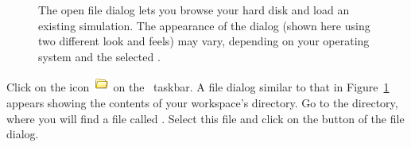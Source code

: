\begin{figure}[htb]
  \centering
  \caption{The open file dialog lets you browse your hard disk and load an existing simulation. The appearance of the dialog 
  (shown here using two different look and feels) may vary, depending on your operating system and the selected .}
  \label{fig:03ExplorationJavascript/OpenDialog}
\end{figure}

Click on the  icon \includegraphics[scale=\linescale]{../_common/icons_png/openSmall.png} on the \ejs\ taskbar. A file dialog
similar to that in Figure~\ref{fig:03ExplorationJavascript/OpenDialog} appears showing the contents of your workspace's 
directory. Go to the  directory, where you will find a
file called . Select this file and click on the  button of the
file dialog.

